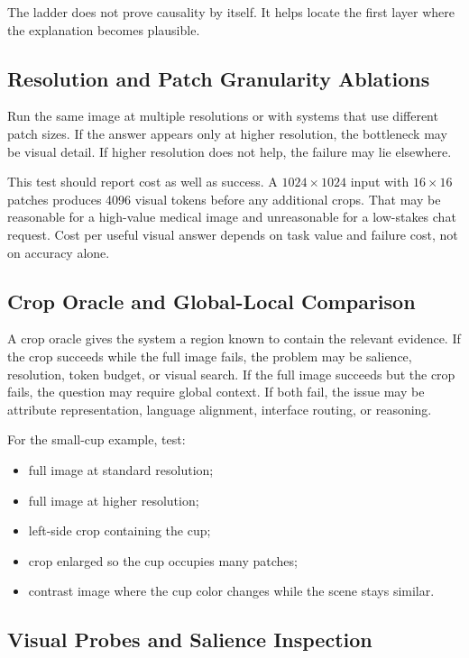 The ladder does not prove causality by itself. It helps locate the first layer where the explanation becomes plausible.

\subsection{Resolution and Patch Granularity Ablations}

Run the same image at multiple resolutions or with systems that use different patch sizes. If the answer appears only at higher resolution, the bottleneck may be visual detail. If higher resolution does not help, the failure may lie elsewhere.

This test should report cost as well as success. A $1024 \times 1024$ input with $16 \times 16$ patches produces 4096 visual tokens before any additional crops. That may be reasonable for a high-value medical image and unreasonable for a low-stakes chat request. Cost per useful visual answer depends on task value and failure cost, not on accuracy alone.

\subsection{Crop Oracle and Global-Local Comparison}

A crop oracle gives the system a region known to contain the relevant evidence. If the crop succeeds while the full image fails, the problem may be salience, resolution, token budget, or visual search. If the full image succeeds but the crop fails, the question may require global context. If both fail, the issue may be attribute representation, language alignment, interface routing, or reasoning.

For the small-cup example, test:

\begin{itemize}[nosep,leftmargin=1.5em]
  \item full image at standard resolution;
  \item full image at higher resolution;
  \item left-side crop containing the cup;
  \item crop enlarged so the cup occupies many patches;
  \item contrast image where the cup color changes while the scene stays similar.
\end{itemize}

\subsection{Visual Probes and Salience Inspection}

